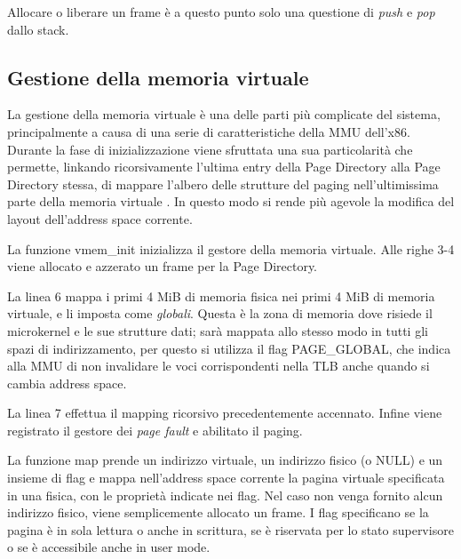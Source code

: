 \documentclass[12pt,a4paper]{report}
\begin{document}
			Allocare o liberare un frame è a questo punto solo una questione di \emph{push} e \emph{pop} dallo stack.
			
		\subsection{Gestione della memoria virtuale}
			La gestione della memoria virtuale è una delle parti più complicate del sistema, principalmente
			a causa di una serie di caratteristiche della MMU dell'x86.
			Durante la fase di inizializzazione viene sfruttata una sua particolarità che permette,
			linkando ricorsivamente l'ultima entry della Page Directory alla Page Directory stessa,
			di mappare l'albero delle strutture del paging nell'ultimissima parte della memoria
			virtuale \cite{OSDEV_MMU}.
			In questo modo si rende più agevole la modifica del layout dell'address space corrente.
			
			
			
			La funzione vmem\_init inizializza il gestore della memoria virtuale.
			Alle righe 3-4 viene allocato e azzerato un frame per la Page Directory.
			
			La linea 6 mappa i primi 4 MiB di memoria fisica nei primi 4 MiB di memoria virtuale, e li imposta come \emph{globali}.
			Questa è la zona di memoria dove risiede il microkernel e le sue strutture dati; sarà mappata allo stesso modo in tutti
			gli spazi di indirizzamento, per questo si utilizza il flag PAGE\_GLOBAL, che indica alla MMU di non invalidare le voci
			corrispondenti nella TLB anche quando si cambia address space.
			
			La linea 7 effettua il mapping ricorsivo precedentemente accennato.
			Infine viene registrato il gestore dei \emph{page fault} e abilitato il paging.
			
			
			
			La funzione map prende un indirizzo virtuale, un indirizzo fisico (o NULL) e un insieme di flag
			e mappa nell'address space corrente la pagina virtuale specificata in una fisica, con le proprietà
			indicate nei flag.
			Nel caso non venga fornito alcun indirizzo fisico, viene semplicemente allocato un frame.
			I flag specificano se la pagina è in sola lettura o anche in scrittura, se è
			riservata per lo stato supervisore o se è accessibile anche in user mode.
			
\end{document}
